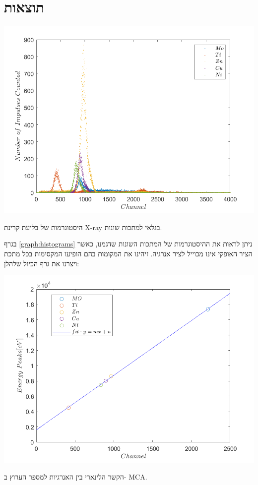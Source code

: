 \documentclass{article}
\begin{document}
\section{תוצאות}

\begin{graph}[H]
    \centering
    \includegraphics[width=\textwidth]{spec.png}
    \caption{
    היסטוגרמות של בליעת קרינת
    \textenglish{X-ray}
    בגלאי למתכות שונות.
    }
    \label{graph:histograms}
\end{graph}

בגרף
\ref{graph:histograms}
ניתן לראות את ההיסטוגרמות של המתכות השונות שדגמנו, כאשר הציר האופקי אינו מכוייל לציר אנרגיה. זיהינו את המקומות בהם הופיעו המקסימות בכל מתכת ויצרנו את גרף הכיול שלהלן:

\begin{graph}[H]
    \centering
    \includegraphics[width=\textwidth]{calibration.png}
    \caption{
    הקשר הלינארי בין האנרגיות למספר הערוץ ב-
    \textenglish{MCA}.
    }
    \label{graph:MCA-energies}
\end{graph}
\end{document}
